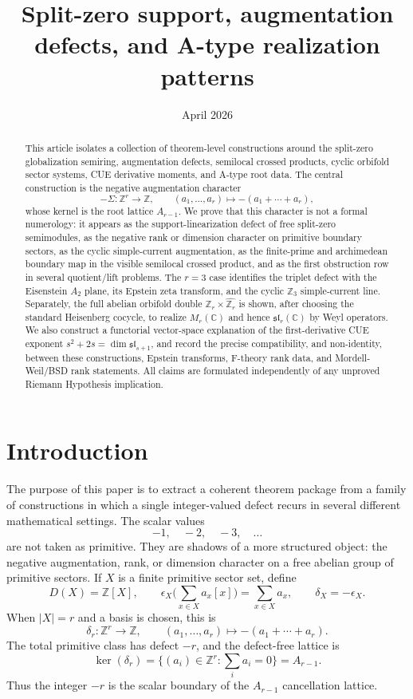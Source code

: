 \documentclass[11pt]{amsart}
\title[Split-zero support and augmentation defects]{Split-zero support, augmentation defects, and A-type realization patterns}
\author{}
\date{April 2026}
\newcommand{\ZZ}{\mathbb Z}
\newcommand{\CC}{\mathbb C}
\begin{document}
\begin{abstract}
This article isolates a collection of theorem-level constructions around the split-zero globalization semiring, augmentation defects, semilocal crossed products, cyclic orbifold sector systems, CUE derivative moments, and A-type root data.  The central construction is the negative augmentation character
\[
   -\Sigma:\ZZ^r\longrightarrow \ZZ,
       \qquad (a_1,\ldots,a_r)\longmapsto -(a_1+\cdots+a_r),
\]
whose kernel is the root lattice $A_{r-1}$.  We prove that this character is not a formal numerology: it appears as the support-linearization defect of free split-zero semimodules, as the negative rank or dimension character on primitive boundary sectors, as the cyclic simple-current augmentation, as the finite-prime and archimedean boundary map in the visible semilocal crossed product, and as the first obstruction row in several quotient/lift problems.  The $r=3$ case identifies the triplet defect with the Eisenstein $A_2$ plane, its Epstein zeta transform, and the cyclic $\ZZ_3$ simple-current line.  Separately, the full abelian orbifold double $\ZZ_r\times \widehat{\ZZ_r}$ is shown, after choosing the standard Heisenberg cocycle, to realize $M_r(\CC)$ and hence $\mathfrak{sl}_r(\CC)$ by Weyl operators.  We also construct a functorial vector-space explanation of the first-derivative CUE exponent $s^2+2s=\dim\mathfrak{sl}_{s+1}$, and record the precise compatibility, and non-identity, between these constructions, Epstein transforms, F-theory rank data, and Mordell-Weil/BSD rank statements.  All claims are formulated independently of any unproved Riemann Hypothesis implication.
\end{abstract}
\maketitle

\tableofcontents

\section{Introduction}

The purpose of this paper is to extract a coherent theorem package from a family of constructions in which a single integer-valued defect recurs in several different mathematical settings.  The scalar values
\[
        -1,\quad -2,\quad -3,\quad \ldots
\]
are not taken as primitive.  They are shadows of a more structured object: the negative augmentation, rank, or dimension character on a free abelian group of primitive sectors.  If $X$ is a finite primitive sector set, define
\[
       D(X)=\ZZ[X],
       \qquad
       \epsilon_X\Big(\sum_{x\in X} a_x[x]\Big)=\sum_{x\in X}a_x,
       \qquad
       \delta_X=-\epsilon_X.
\]
When $|X|=r$ and a basis is chosen, this is
\[
       \delta_r:\ZZ^r\to\ZZ,
       \qquad
       (a_1,\ldots,a_r)\mapsto-(a_1+\cdots+a_r).
\]
The total primitive class has defect $-r$, and the defect-free lattice is
\[
       \ker(\delta_r)=\{(a_i)\in\ZZ^r:\sum_i a_i=0\}=A_{r-1}.
\]
Thus the integer $-r$ is the scalar boundary of the $A_{r-1}$ cancellation lattice.
\end{document}
